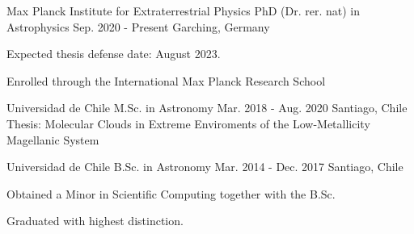 

\begin{cventries}

 \cventry
    {Max Planck Institute for Extraterrestrial Physics} %
    {PhD (Dr. rer. nat) in Astrophysics} %
    {Sep. 2020 - Present} %
    {Garching, Germany} %
    { \begin{cvitems} %
      \item{Expected thesis defense date: August 2023.}
       \item {Enrolled through the International Max Planck Research School}
      \end{cvitems}
      }


 \cventry
    {Universidad de Chile} %
    {M.Sc. in Astronomy} %
    {Mar. 2018 - Aug. 2020} %
    {Santiago, Chile} %
    {Thesis:   Molecular Clouds in Extreme Enviroments of the Low-Metallicity Magellanic System }

  \cventry
    {Universidad de Chile} %
    {B.Sc. in Astronomy} %
    {Mar. 2014 - Dec. 2017} %
     {Santiago, Chile} %
    {
      \begin{cvitems} %
      \item{Obtained a Minor in Scientific Computing together with the B.Sc.}
       \item {Graduated with highest distinction.}
      \end{cvitems}
    }

\end{cventries}
